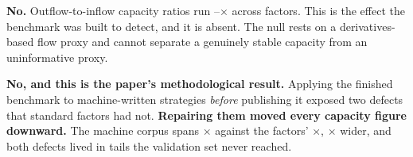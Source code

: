 \documentclass[11pt,a4paper]{article}
\begin{document}
\begin{finding}[title={5.\ \ Does capacity collapse when foreign money leaves?
  \hfill\tagindep}]
\textbf{No.} Outflow-to-inflow capacity ratios run \fsFlowRatioMin{}--\fsFlowRatioMax$\times$
across \fsFlowNFactors{} factors. This is the effect the benchmark was built to detect, and it is
absent. The null rests on a derivatives-based flow proxy and cannot separate a genuinely stable
capacity from an uninformative proxy.
\end{finding}

\begin{finding}[title={6.\ \ Did validating on familiar strategies suffice? \hfill\tagmethod}]
\textbf{No, and this is the paper's methodological result.} Applying the finished benchmark to
\fsCorpusN{} machine-written strategies \emph{before} publishing it exposed two defects that
\fsNFactors{} standard factors had not. \textbf{Repairing them moved every capacity figure
downward.} The machine corpus spans \fsCorpusSpan$\times$ against the factors' \fsFactorSpan$\times$,
\fsSpanRatio$\times$ wider, and both defects lived in tails the validation set never reached.
\end{finding}

\vspace{0.6em}
\trilogymap

\clearpage
{\hypersetup{linkcolor=navy}\tableofcontents}
\clearpage
\end{document}
